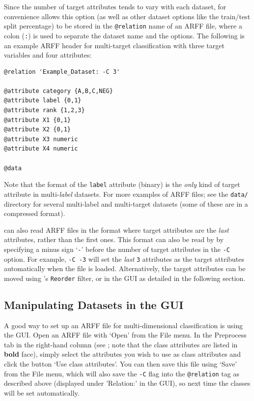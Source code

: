 \documentclass[11pt]{article}
\newcommand{\MEKA}{Meka}
\newcommand{\WEKA}{Weka}
\newcommand{\MULAN}{Mulan}
\begin{document}
Since the number of target attributes tends to vary with each dataset, for convenience \framework{\MEKA} allows this option (as well as other dataset options like the train/test split percentage) to be stored in the \texttt{@relation} name of an ARFF file, where a colon (\texttt{:}) is used to separate the dataset name and the options. The following is an example ARFF header for multi-target classification with three target variables and four attributes:
 
{\small

\begin{lstlisting}
@relation 'Example_Dataset: -C 3'

@attribute category {A,B,C,NEG}
@attribute label {0,1}
@attribute rank {1,2,3}
@attribute X1 {0,1}
@attribute X2 {0,1}
@attribute X3 numeric
@attribute X4 numeric

@data
\end{lstlisting}
}

Note that the format of the \texttt{label} attribute (binary) is the \emph{only} kind of target attribute in multi-\emph{label} datasets. For more examples of \framework{\MEKA} ARFF files; see the \texttt{data/} directory for several multi-label and multi-target datasets (some of these are in a compressed format).

\framework{\MEKA} can also read ARFF files in the \framework{\MULAN} format where target attributes are the \emph{last} attributes, rather than the first ones. This format can also be read by \framework{\MEKA} by specifying a minus sign `\texttt{-}' before the number of target attributes in the \texttt{-C} option. For example, \texttt{-C -3} will set the \emph{last} \texttt{3} attributes as the target attributes automatically when the file is loaded. Alternatively, the target attributes can be moved using \framework{\WEKA}'s \texttt{Reorder} filter, or in the GUI as detailed in the following section. %


\subsection{Manipulating Datasets in the GUI}
\label{sec:data.gui}

A good way to set up an ARFF file for multi-dimensional classification is using the GUI. Open an ARFF file with `\textsf{Open}' from the \textsf{File} menu. In the \textsf{Preprocess} tab in the right-hand column (see ; note that the class attributes are listed in \textbf{bold} face), simply select the attributes you wish to use as class attributes and click the button `\textsf{Use class attributes}'. You can then save this file using `\textsf{Save}' from the \textsf{File} menu, which will also save the \texttt{-C} flag into the \texttt{@relation} tag as described above (displayed under '\textsf{Relation:}' in the GUI), so next time the classes will be set automatically.
\end{document}

